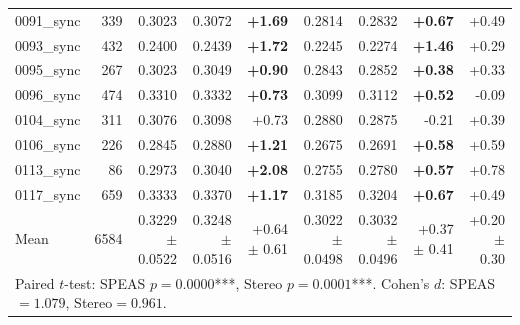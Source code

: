 \begin{table}[t]
{\begin{tabular}{lrrrrrrrr}
0091\_sync & 339 & 0.3023 & 0.3072 & \textbf{+1.69} & 0.2814 & 0.2832 & \textbf{+0.67} & +0.49 \\
0093\_sync & 432 & 0.2400 & 0.2439 & \textbf{+1.72} & 0.2245 & 0.2274 & \textbf{+1.46} & +0.29 \\
0095\_sync & 267 & 0.3023 & 0.3049 & \textbf{+0.90} & 0.2843 & 0.2852 & \textbf{+0.38} & +0.33 \\
0096\_sync & 474 & 0.3310 & 0.3332 & \textbf{+0.73} & 0.3099 & 0.3112 & \textbf{+0.52} & -0.09 \\
0104\_sync & 311 & 0.3076 & 0.3098 & +0.73 & 0.2880 & 0.2875 & -0.21 & +0.39 \\
0106\_sync & 226 & 0.2845 & 0.2880 & \textbf{+1.21} & 0.2675 & 0.2691 & \textbf{+0.58} & +0.59 \\
0113\_sync & 86 & 0.2973 & 0.3040 & \textbf{+2.08} & 0.2755 & 0.2780 & \textbf{+0.57} & +0.78 \\
0117\_sync & 659 & 0.3333 & 0.3370 & \textbf{+1.17} & 0.3185 & 0.3204 & \textbf{+0.67} & +0.49 \\
\midrule
Mean & 6584 & 0.3229 $\pm$ 0.0522 & 0.3248 $\pm$ 0.0516 & +0.64 $\pm$ 0.61 & 0.3022 $\pm$ 0.0498 & 0.3032 $\pm$ 0.0496 & +0.37 $\pm$ 0.41 & +0.20 $\pm$ 0.30 \\
\multicolumn{9}{l}{\footnotesize Paired $t$-test: SPEAS $p=0.0000$***, Stereo $p=0.0001$***. Cohen's $d$: SPEAS$=1.079$, Stereo$=0.961$.} \\
\bottomrule
\end{tabular}}
\end{table}
